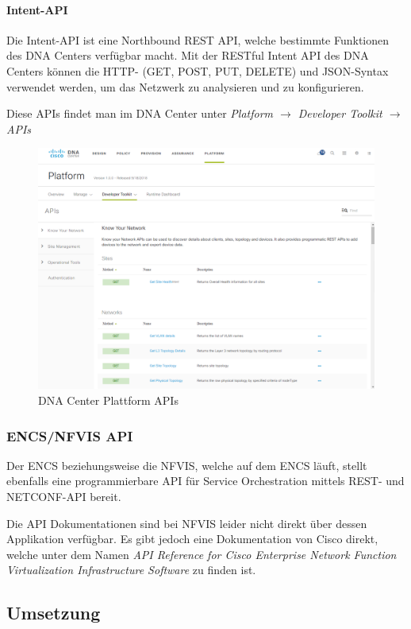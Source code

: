 \paragraph{Intent-API}

Die Intent-API ist eine Northbound REST API, welche bestimmte Funktionen des DNA Centers verfügbar macht. Mit der RESTful Intent API des DNA Centers können die HTTP- (GET, POST, PUT, DELETE) und JSON-Syntax verwendet werden, um das Netzwerk zu analysieren und zu konfigurieren. \cite{dnac-platform}

Diese APIs findet man im DNA Center unter \textit{Platform $\rightarrow$ Developer Toolkit $\rightarrow$ APIs}

\begin{figure}[H]
	\centering
	\includegraphics[width=0.8\linewidth]{img/Abstrahierung/dnac-apis}
	\caption{DNA Center Plattform APIs}
	\label{fig:DNA Center Plattform APIs}
\end{figure}

\subsubsection{ENCS/NFVIS API}
Der ENCS beziehungsweise die NFVIS, welche auf dem ENCS läuft, stellt ebenfalls eine programmierbare API für Service Orchestration mittels REST- und NETCONF-API bereit. 

Die API Dokumentationen sind bei NFVIS leider nicht direkt über dessen Applikation verfügbar. Es gibt jedoch eine Dokumentation von Cisco direkt, welche unter dem Namen \textit{API Reference for Cisco Enterprise Network Function Virtualization Infrastructure Software} \cite{nfvis-api} zu finden ist.


\subsection{Umsetzung}

